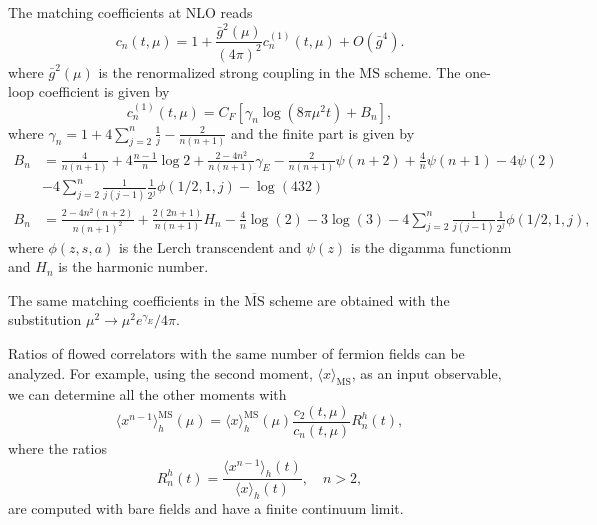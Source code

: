 \documentclass[10pt]{article}
\begin{document}
The matching coefficients at NLO reads
\begin{equation}
c_n(t,\mu) =  1 + \frac{\bar{g}^2(\mu)}{(4 \pi)^2}c_n^{(1)}(t,\mu) + 
O(\bar{g}^4).
\label{eq:cn_1l}
\end{equation}
where $\bar{g}^2(\mu)$ is the renormalized strong coupling in the $\mathrm{MS}$ scheme. The one-loop coefficient is given by
\begin{equation}
c_n^{(1)}(t,\mu) = C_F \left[ \gamma_n \log \left(8 \pi \mu^2 t \right) + B_n\right],
\label{eq:matching_1l}
\end{equation}
where $\gamma_n = 1 + 4 \sum_{j=2}^n \frac{1}{j} - \frac{2}{n(n+1)}$ and the finite part is given by 
\begin{equation}
\begin{aligned}
B_n &= \frac{4}{n(n+1)} + 4 \frac{n-1}{n}\log 2 + \frac{2-4 n^2}{n(n+1)}\gamma_E - \frac{2}{n(n+1)}\psi(n+2) + \frac{4}{n}\psi(n+1) - 4 \psi(2) \nonumber \\
&- 4 \sum_{j=2}^n \frac{1}{j(j-1)} \frac{1}{2^j} \phi(1/2,1,j) - \log \left(432\right) \\
B_n &= \frac{2-4n^2(n+2)}{n(n+1)^2} + \frac{2(2n+1)}{n(n+1)}H_n - \frac{4}{n} \log(2) - 3 \log(3) - 4 \sum_{j=2}^n \frac{1}{j(j-1)} \frac{1}{2^j} \phi(1/2,1,j),
\end{aligned}
\label{eq:finite}
\end{equation} 
where $\phi(z,s,a)$ is the Lerch transcendent and $\psi(z)$ is the digamma functionm and $H_n$ is the harmonic number.

The same matching coefficients in the $\overline{\mathrm{MS}}$ scheme are obtained with the substitution $\mu^2\rightarrow \mu^2 e^{\gamma_E}/4\pi$.

Ratios of flowed correlators with the same number of fermion fields can be analyzed. For example, using the second moment, $\langle x \rangle_{\mathrm{MS}}$, as an input observable, we can determine all the other moments with
\begin{equation}
\langle x^{n-1} \rangle^{\mathrm{MS}}_h(\mu) = 
\langle x \rangle^{\mathrm{MS}}_h(\mu)
\frac{c_{2}(t,\mu)}{c_n(t,\mu)} R_n^h(t),
\label{eq:ratio_n2}
\end{equation}
where the ratios 
\begin{equation}
R_n^h(t) = \frac{\langle x^{n-1} \rangle_{h}(t)}{\langle x\rangle_{h}(t)},
\quad n>2,
\label{eq:Rn}
\end{equation}
are computed with bare fields and have a finite continuum limit.
\end{document}
